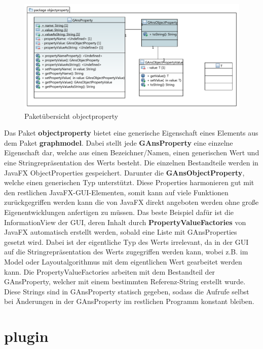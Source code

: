 \begin{figure}[hb]
  \centering
  \includegraphics[width=380pt]{resourcen/objectproperty.pdf}
  \caption{Paketübersicht objectproperty}
  \label{fig:packge_objectproperty}
\end{figure}

Das Paket \textbf{objectproperty} bietet eine generische Eigenschaft eines Elements aus dem Paket \textbf{graphmodel}. Dabei stellt jede \textbf{GAnsProperty} eine einzelne Eigenschaft dar, welche aus einen Bezeichner/Namen, einen generischen Wert und eine Stringrepräsentation des Werts besteht. Die einzelnen Bestandteile werden in JavaFX ObjectProperties gespeichert. Darunter die \textbf{GAnsObjectProperty}, welche einen generischen Typ unterstützt. Diese Properties harmonieren gut mit den restlichen JavaFX-GUI-Elementen, somit kann auf viele Funktionen zurückgegriffen werden kann die von JavaFX direkt angeboten werden ohne große Eigenentwicklungen anfertigen zu müssen. Das beste Beispiel dafür ist die InformationView der GUI, deren Inhalt durch \textbf{PropertyValueFactories} von JavaFX automatisch erstellt werden, sobald eine Liste mit GAnsProperties gesetzt wird. Dabei ist der eigentliche Typ des Werts irrelevant, da in der GUI auf die Stringrepräsentation des Werts zugegriffen werden kann, wobei z.B. im Model oder Layoutalgorithmus mit dem eigentlichen Wert gearbeitet werden kann. Die PropertyValueFactories arbeiten mit dem Bestandteil der GAnsProperty, welcher mit einem bestimmten Referenz-String erstellt wurde. Diese Strings sind in GAnsProperty statisch gegeben, sodass die Aufrufe selbst bei Änderungen in der GAnsProperty im restlichen Programm konstant bleiben.

\newpage

\section{plugin}

